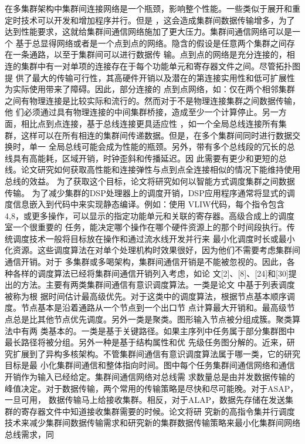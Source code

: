 在多集群架构中集群间连接网络是一个瓶颈，影响整个性能。一些类似于展开和重定时技术可以开发和增加程序并行。但是
，这会造成集群间数据传输增多，为了达到性能要求，这就给集群间通信网络施加了更大压力。集群间通信网络可以是一个
基于总显得网络或者是一个点到点的网络。隐含的假设是任意两个集群之间存在一条通路，以至于集群间可以进行数据传
输。点到点的网络是充分连接的，相连的集群中有一对单项的连接存在于每个功能单元和寄存器文件之间。尽管拓扑图提
供了最大的传输可行性，其高硬件开销以及潜在的第连接实用性和低可扩展性为实际使用带来了障碍。因此，部分连接的
点到点网络，如：仅在两个相邻集群之间有物理连接是比较实际和流行的。然而对于不是物理连接集群之间数据传输，他
们必须通过具有物理连接的中间集群桥接，造成至少一个计算停止。另一方面，相比点到点连接，基于总线连接更具适应性
，如一个全局总线连接所有集群，这样可以在所有相连的集群间传递数据。但是，在多个集群间同时进行数据交换时，单一
全局总线可能会成为性能的瓶颈。另外，带有多个总线段的冗长的总线具有高能耗，区域开销，时钟歪斜和传播延迟。因
此需要有更少和更短的总线。论文研究如何获取高性能和连接弹性与点到点全连接相似的情况下能维持使用总线的效益。
为了获取这个目标，论文将研究如何以智能方式调度集群之间数据传输。
为了减少集群的DSP处理器上的调度开销，DSP应用程序通常将显式的调度信息嵌入到代码中来实现静态编译。例如：使用
VLIW代码，每个指令包含4,8，或更多操作，可以显示的指定功能单元和关联的寄存器。高级合成上的调度室一个很重要的
任务，能决定哪个操作在哪个硬件资源上的那个时间段执行。传统调度技术一般将目标放在操作和通过流水线开发并行来
最小化调度时长或最小化资源。这些调度算法在对单个处理机构时效果很好，因为他们不需要考虑集群间通信开销。对于
多集群或多喝架构，集群间通信开销是不能被忽视的。因此，各种各样的调度算法已经将集群间通信开销列入考虑，如论
文\cite{cnproceed}[2]、[8]、[24]和[30]提出的方法。主要有两类集群间通信有意识调度算法。一类是论文\cite{cnarticle} 中基于列表调度被称为根
据时间估计最高级优先。对于这类中的调度算法，根据节点基本顺序调度。节点基本是沿着通路从一个节点到一个出口节
点计算最大开销和。最高级节点总是比其他节点优先调度。另外一类是聚类。图形输入节点被分组成簇。聚类算法中有两
类基本的。一类是基于关键路径。如果主序列中任务属于部分集群图中最长路径将被分组。另外一种是基于结构属性和优
先级任务图分解的。近来，研究扩展到了异构多核架构。不管集群间通信有意识调度算法属于哪一类，它的研究目标是最
小化集群间通信和整体指向时间。图中每个任务集群间通信网络和通信开销作为输入已经给定。集群间通信网络对总线需
求数量总是由并发数据传输的峰值决定。对于数据传输，两个常用的传输策略是尽快和尽可能晚。对于ASAP，一旦可用，
数据传输马上给接收集群。相反，对于ALAP，数据先存储在发送集群的寄存器文件中知道接收集群需要的时候。论文将研
究新的高指令集并行调度技术来减少集群间数据传输需求和研究新的集群数据传输策略来最小化集群间网络总线需求，同
